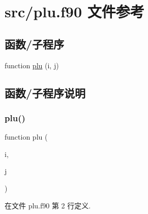\hypertarget{plu_8f90}{}\section{src/plu.f90 文件参考}
\label{plu_8f90}
\subsection*{函数/子程序}
\begin{DoxyCompactItemize}
\item 
function \mbox{\hyperlink{plu_8f90_aeb8c9c33aff79a9658e4b9a0bd0e88c2}{plu}} (i, j)
\end{DoxyCompactItemize}


\subsection{函数/子程序说明}
\mbox{\label{plu_8f90_aeb8c9c33aff79a9658e4b9a0bd0e88c2}} 
\subsubsection{\texorpdfstring{plu()}{plu()}}
{\footnotesize\ttfamily function plu (\begin{DoxyParamCaption}\item[{}]{i,  }\item[{}]{j }\end{DoxyParamCaption})}



在文件 plu.\+f90 第 2 行定义.

